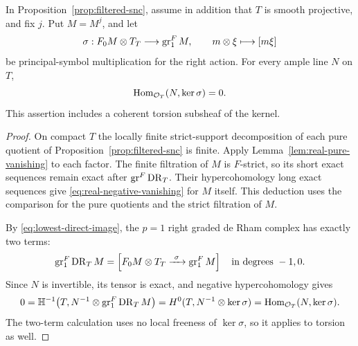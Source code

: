 \begin{corollary}\label{cor:symbol-kernel}
In Proposition~\ref{prop:filtered-snc}, assume in addition that \(T\)
is smooth projective, and fix \(j\).  Put \(M=M^j\), and let
\[
 \sigma:F_0M\otimes T_T\longrightarrow\operatorname{gr}^F_1M,
 \qquad m\otimes\xi\longmapsto[m\xi]
\]
be principal-symbol multiplication for the right action.  For every
ample line \(N\) on \(T\),
\begin{equation}\label{eq:symbol-hom-vanishing}
 \operatorname{Hom}_{\mathcal O_T}(N,\ker\sigma)=0.
\end{equation}
This assertion includes a coherent torsion subsheaf of the kernel.
\end{corollary}
\begin{proof}
On compact \(T\) the locally finite strict-support decomposition of
each pure quotient of Proposition~\ref{prop:filtered-snc} is finite.
Apply Lemma~\ref{lem:real-pure-vanishing} to each factor.  The finite
filtration of \(M\) is \(F\)-strict, so its short exact sequences remain
exact after \(\operatorname{gr}^F\operatorname{DR}_T\).  Their hypercohomology long exact sequences
give \eqref{eq:real-negative-vanishing} for \(M\) itself.  This deduction
uses the comparison for the pure quotients and the strict filtration of
\(M\).

By \eqref{eq:lowest-direct-image}, the \(p=1\) right graded de Rham
complex has exactly two terms:
\begin{equation}\label{eq:first-symbol-complex}
 \operatorname{gr}^F_1\operatorname{DR}_T M=
 \left[F_0M\otimes T_T\xrightarrow{\ \sigma\ }\operatorname{gr}^F_1M\right]
 \quad\text{in degrees }-1,0.
\end{equation}
Since \(N\) is invertible, its tensor is exact, and negative
hypercohomology gives
\[
 0=\mathbb H^{-1}\bigl(T,N^{-1}\otimes\operatorname{gr}^F_1\operatorname{DR}_T M\bigr)
 =H^0(T,N^{-1}\otimes\ker\sigma)
 =\operatorname{Hom}_{\mathcal O_T}(N,\ker\sigma).
\]
The two-term calculation uses no local freeness of \(\ker\sigma\), so
it applies to torsion as well.
\end{proof}
